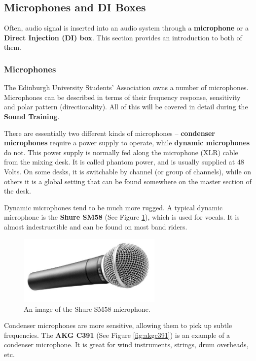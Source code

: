 \documentclass[14pt,twocolumn]{extarticle} %
\begin{document}
\subsection{Microphones and DI Boxes}
\label{mics-di}
Often, audio signal is inserted into an audio system through a \textbf{microphone} or a \textbf{Direct Injection (DI) box}. This section provides an introduction to both of them.

\subsubsection{Microphones}
\label{mics}
The Edinburgh University Students' Association owns a number of microphones. Microphones can be described in terms of their frequency  response, sensitivity and polar pattern (directionality). All of this will be covered in detail during the \textbf{Sound Training}.

There are essentially two different kinds of microphones – \textbf{condenser microphones} require a power supply to operate, while \textbf{dynamic microphones} do not. This power supply is normally fed along the microphone (XLR) cable from the mixing desk. It is called phantom power, and is usually supplied at 48 Volts. On some desks, it is switchable by channel (or group of channels), while on others it is a global setting that can be found somewhere on the master section of the desk.

Dynamic microphones tend to be much more rugged. A typical dynamic microphone is the \textbf{Shure SM58} (See Figure \ref{fig:sm58}), which is used for vocals. It is almost indestructible and can be found on most band riders. 

\begin{figure}[h]
\begin{center}

\includegraphics[width=7cm]{SM58.jpg}
\caption{An image of the Shure SM58 microphone.}
\label{fig:sm58}

\end{center}
\end{figure}

Condenser microphones are more sensitive, allowing them to pick up subtle frequencies. The \textbf{AKG C391} (See Figure \ref{fig:akgc391}) is an example of a condenser microphone. It is great for wind instruments, strings, drum overheads, etc.
\end{document}
